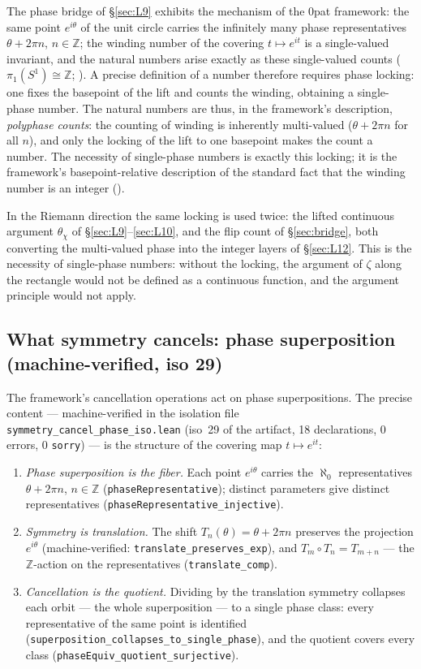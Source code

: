 \documentclass{article}
\newcommand{\Z}{\mathbb{Z}}
\newcommand{\zt}{\zeta}
\newcommand{\Xchi}{\chi}
\begin{document}
The phase bridge of \S\ref{sec:L9} exhibits the mechanism of the 0pat
framework: the same point $e^{i\theta}$ of the unit circle carries the
infinitely many phase representatives $\theta+2\pi n$, $n\in\Z$; the winding
number of the covering $t\mapsto e^{it}$ is a single-valued invariant, and
the natural numbers arise exactly as these single-valued counts
($\pi_1(S^1)\cong\Z$; \cite{hatcher}). A precise definition of a number
therefore requires phase locking: one fixes the basepoint of the lift and
counts the winding, obtaining a single-phase number. The natural numbers
are thus, in the framework's description, \emph{polyphase counts}: the
counting of winding is inherently multi-valued ($\theta+2\pi n$ for all
$n$), and only the locking of the lift to one basepoint makes the count a
number. The necessity of single-phase numbers is exactly this locking; it
is the framework's basepoint-relative description of the standard fact
that the winding number is an integer (\cite{patbase}).

In the Riemann direction the same locking is used twice: the lifted
continuous argument $\theta_\Xchi$ of \S\ref{sec:L9}--\ref{sec:L10}, and
the flip count of \S\ref{sec:bridge}, both converting the multi-valued
phase into the integer layers of \S\ref{sec:L12}. This is the necessity of
single-phase numbers: without the locking, the argument of $\zt$ along the
rectangle would not be defined as a continuous function, and the argument
principle would not apply.

\subsection*{What symmetry cancels: phase superposition (machine-verified, iso 29)}

The framework's cancellation operations act on phase superpositions. The
precise content --- machine-verified in the isolation file
\texttt{symmetry\_cancel\_phase\_iso.lean} (iso~29 of the artifact, 18
declarations, 0 errors, 0 \texttt{sorry}) --- is the structure of the
covering map $t\mapsto e^{it}$:

\begin{enumerate}
\item \emph{Phase superposition is the fiber.} Each point $e^{i\theta}$
carries the $\aleph_0$ representatives $\theta+2\pi n$, $n\in\mathbb Z$
(\texttt{phaseRepresentative}); distinct parameters give distinct
representatives (\texttt{phaseRepresentative\_injective}).
\item \emph{Symmetry is translation.} The shift
$T_n(\theta)=\theta+2\pi n$ preserves the projection $e^{i\theta}$
(machine-verified: \texttt{translate\_preserves\_exp}), and
$T_m\circ T_n=T_{m+n}$ --- the $\mathbb Z$-action on the representatives
(\texttt{translate\_comp}).
\item \emph{Cancellation is the quotient.} Dividing by the translation
symmetry collapses each orbit --- the whole superposition --- to a single
phase class: every representative of the same point is identified
(\texttt{superposition\_collapses\_to\_single\_phase}), and the quotient
covers every class (\texttt{phaseEquiv\_quotient\_surjective}).
\end{enumerate}
\end{document}
